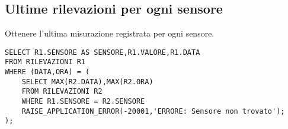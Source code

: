 \subsection{Ultime rilevazioni per ogni sensore}
Ottenere l'ultima misurazione registrata per ogni sensore.
\begin{verbatim}
SELECT R1.SENSORE AS SENSORE,R1.VALORE,R1.DATA
FROM RILEVAZIONI R1
WHERE (DATA,ORA) = (
    SELECT MAX(R2.DATA),MAX(R2.ORA)
    FROM RILEVAZIONI R2
    WHERE R1.SENSORE = R2.SENSORE
    RAISE_APPLICATION_ERROR(-20001,'ERRORE: Sensore non trovato');
);
\end{verbatim}
